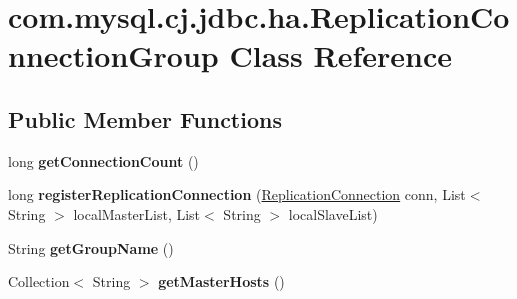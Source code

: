 \hypertarget{classcom_1_1mysql_1_1cj_1_1jdbc_1_1ha_1_1_replication_connection_group}{}\section{com.\+mysql.\+cj.\+jdbc.\+ha.\+Replication\+Connection\+Group Class Reference}
\label{classcom_1_1mysql_1_1cj_1_1jdbc_1_1ha_1_1_replication_connection_group}
\subsection*{Public Member Functions}
\begin{DoxyCompactItemize}
\item 
\mbox{\label{classcom_1_1mysql_1_1cj_1_1jdbc_1_1ha_1_1_replication_connection_group_a6e9dca65e606501a5c538e52026d85b6}} 
long {\bfseries get\+Connection\+Count} ()
\item 
\mbox{\label{classcom_1_1mysql_1_1cj_1_1jdbc_1_1ha_1_1_replication_connection_group_a3071d0f8628bcc858c1043648dfa5cc6}} 
long {\bfseries register\+Replication\+Connection} (\mbox{\hyperlink{interfacecom_1_1mysql_1_1cj_1_1jdbc_1_1ha_1_1_replication_connection}{Replication\+Connection}} conn, List$<$ String $>$ local\+Master\+List, List$<$ String $>$ local\+Slave\+List)
\item 
\mbox{\label{classcom_1_1mysql_1_1cj_1_1jdbc_1_1ha_1_1_replication_connection_group_a8a41769fe2c58ca69d5c81c8e46bfac4}} 
String {\bfseries get\+Group\+Name} ()
\item 
\mbox{\label{classcom_1_1mysql_1_1cj_1_1jdbc_1_1ha_1_1_replication_connection_group_ada95a698bb8c8006815c471771574f74}} 
Collection$<$ String $>$ {\bfseries get\+Master\+Hosts} ()
\item 
\mbox{\label{classcom_1_1mysql_1_1cj_1_1jdbc_1_1ha_1_1_replication_connection_group_a5698926580f2370aaf7cf64460826efb}} 

\end{DoxyCompactItemize}
